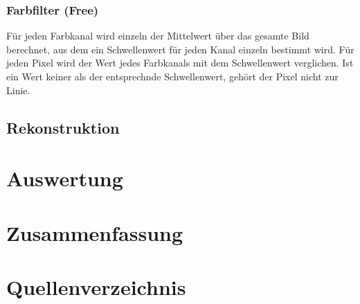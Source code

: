 \documentclass[ngerman,a4paper,parskip=half]{scrartcl}
\begin{document}
\subsubsection{Farbfilter (Free)}

Für jeden Farbkanal wird einzeln der Mittelwert über das gesamte Bild berechnet, aus dem ein Schwellenwert für jeden Kanal einzeln bestimmt wird. Für jeden Pixel wird der Wert jedes Farbkanals mit dem Schwellenwert verglichen. Ist ein Wert keiner als der entsprechnde Schwellenwert, gehört der Pixel nicht zur Linie.

\subsection{Rekonstruktion}


\section{Auswertung}


\section{Zusammenfassung}


\section{Quellenverzeichnis}

\end{document}
